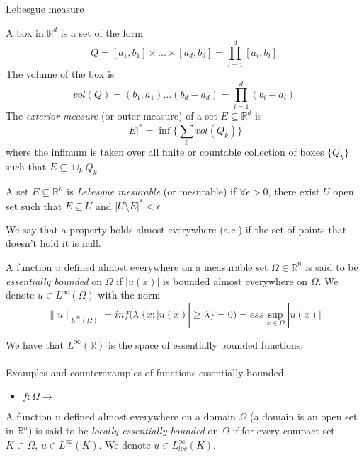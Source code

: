 \documentclass[../main.tex]{subfiles}
\begin{document}
\noindent Lebesgue measure

\begin{definition} A box in $\mathbb{R}^d$ is a set of the form 
	$$ Q = [a_1,b_1]  \times ... \times [a_d,b_d] = \prod_{i=1}^d [a_i,b_i]$$
	The volume of the box is $$ vol(Q)= (b_1,a_1) ... (b_d-a_d)= \prod_{i=1}^d (b_i-a_i)$$
	The \emph{exterior measure} (or outer measure) of a set $E\subseteq \mathbb{R}^d$ is $$ |E|^* = \inf\{\sum_k vol(Q_k)\} $$ 
	where the infimum is taken over all finite or countable collection of boxes $\{Q_k\}$ such that $E \subseteq \cup_k Q_k$
\end{definition}

\begin{definition}
A set $E\subseteq \mathbb{R}^n $ is \emph{Lebesgue mesurable} (or mesurable) if $\forall \epsilon >0$, there exist $U$ open set such that $E \subseteq U$ and $|U\setminus E|^* < \epsilon $
\end{definition}

\begin{definition}
	We say that a property holds almost everywhere (a.e.) if the set of points that doesn’t hold it is null.
\end{definition}
\begin{definition}
	A function $u$ defined almost everywhere on a measurable set $\Omega \in \mathbb{R}^n$ is said to be \emph{essentially bounded} on $\Omega$ if $|u(x)|$ is bounded almost everywhere on $\Omega$. We denote $u\in L^{\infty}(\Omega)$ with the norm $$\|u\|_{L^{\infty}(\Omega)}= inf(\lambda | \{ x : |u(x)| \geq \lambda \} = 0 ) = ess \sup_{x\in \Omega} |u(x)|$$

\end{definition}

\noindent We have that $L^{\infty}(\mathbb{R})$ is the space of essentially bounded functions.
\\ \\ 
Examples and counterexamples of functions essentially bounded. 
\begin{itemize}
\item $f:\Omega \rightarrow $
\end{itemize}

\begin{definition}
	A function u defined almost everywhere on a domain $\Omega$ (a domain is an open set in $\mathbb{R}^n$) is said to be\emph{ locally essentially bounded }on $\Omega$ if for every compact set $K\subset \Omega$, $u\in L^{\infty}(K)$. We denote $u\in L_{loc}^{\infty}(K)$.
\end{definition}
\end{document}

